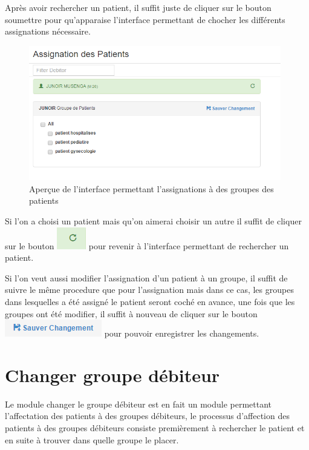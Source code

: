 \documentclass[12pt,a4paper]{report}
\begin{document}
Après avoir rechercher un patient, il suffit juste de cliquer sur le bouton soumettre pour qu'apparaise l'interface permettant de chocher les différents assignations nécessaire.

\begin{figure}[h]
\begin{center}
\includegraphics[width=11cm]{pic/AssiGames.png}
\end{center}
\caption{Aperçue de l'interface permettant l'assignations à des groupes des patients}
\label{Aperçue de l'interface permettant l'assignations à des groupes des patients}
\end{figure} 

Si l'on a choisi un patient mais qu'on aimerai choisir un autre il suffit de cliquer sur le bouton \includegraphics[scale=0.7]{pic/ComeBack.png}  pour revenir à l'interface permettant de rechercher un patient.

Si l'on veut aussi modifier l'assignation d'un patient à un groupe, il suffit de suivre le même procedure que pour l'assignation mais dans ce cas, les groupes dans lesquelles a été assigné le patient seront coché en avance, une fois que les groupes ont été modifier, il suffit à nouveau de cliquer sur le bouton \includegraphics[scale=0.7]{pic/SaveChang.png} pour pouvoir enregistrer les changements.

\section{Changer groupe débiteur}
Le module changer le groupe débiteur est en fait un module permettant l'affectation des patients à des groupes débiteurs, le processus d'affection des patients à des groupes débiteurs consiste premièrement à rechercher le patient et en suite à trouver dans quelle groupe le placer.
\end{document}

